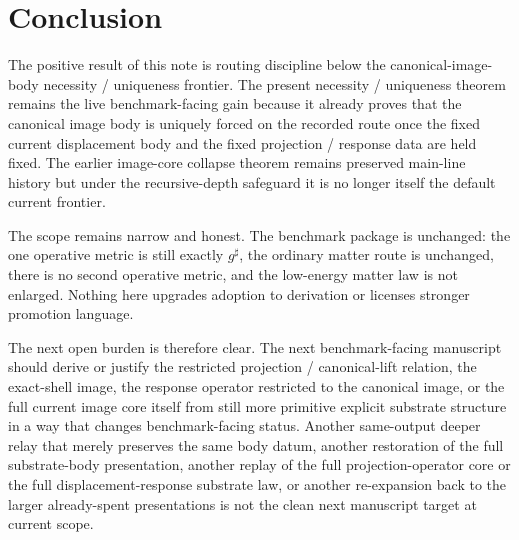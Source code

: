 \documentclass[11pt]{article}
\newcommand{\CompletedMetric}{g^{\sharp}}
\begin{document}
\section{Conclusion}

The positive result of this note is routing discipline below the canonical-image-body necessity / uniqueness frontier. The present necessity / uniqueness theorem remains the live benchmark-facing gain because it already proves that the canonical image body is uniquely forced on the recorded route once the fixed current displacement body and the fixed projection / response data are held fixed. The earlier image-core collapse theorem remains preserved main-line history but under the recursive-depth safeguard it is no longer itself the default current frontier.

The scope remains narrow and honest. The benchmark package is unchanged: the one operative metric is still exactly \(\CompletedMetric\), the ordinary matter route is unchanged, there is no second operative metric, and the low-energy matter law is not enlarged. Nothing here upgrades adoption to derivation or licenses stronger promotion language.

The next open burden is therefore clear. The next benchmark-facing manuscript should derive or justify the restricted projection / canonical-lift relation, the exact-shell image, the response operator restricted to the canonical image, or the full current image core itself from still more primitive explicit substrate structure in a way that changes benchmark-facing status. Another same-output deeper relay that merely preserves the same body datum, another restoration of the full substrate-body presentation, another replay of the full projection-operator core or the full displacement-response substrate law, or another re-expansion back to the larger already-spent presentations is not the clean next manuscript target at current scope.
\end{document}
